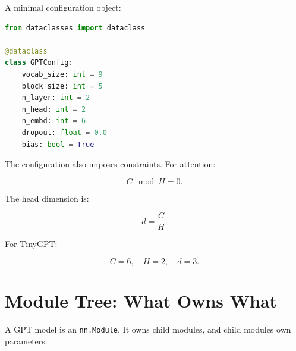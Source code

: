 A minimal configuration object:

\begin{lstlisting}[language=Python]
from dataclasses import dataclass

@dataclass
class GPTConfig:
    vocab_size: int = 9
    block_size: int = 5
    n_layer: int = 2
    n_head: int = 2
    n_embd: int = 6
    dropout: float = 0.0
    bias: bool = True
\end{lstlisting}

The configuration also imposes constraints. For attention:

\[
C \mod H = 0.
\]

The head dimension is:

\[
d=\frac{C}{H}.
\]

For TinyGPT:

\[
C=6,\quad H=2,\quad d=3.
\]

\begin{center}
\end{center}

\section{Module Tree: What Owns What}

A GPT model is an \texttt{nn.Module}. It owns child modules, and child modules own parameters.

